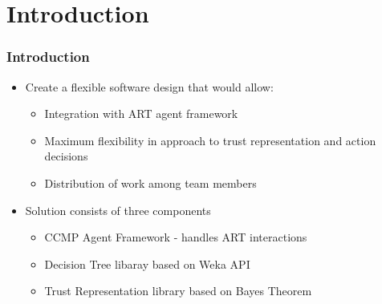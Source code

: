 \section{Introduction}
\begin{frame}
\frametitle{Introduction}
\begin{itemize}
  \item Create a flexible software design that would allow:
  \begin{itemize}
    \item Integration with ART agent framework
    \item Maximum flexibility in approach to trust representation and
    action decisions
    \item Distribution of work among team members
  \end{itemize}
\end{itemize}
\begin{itemize}  
  \item Solution consists of three components
  \begin{itemize}
    \item CCMP Agent Framework - handles ART interactions
    \item Decision Tree libaray based on Weka API
    \item Trust Representation library based on Bayes Theorem
  \end{itemize}
\end{itemize}

\end{frame}